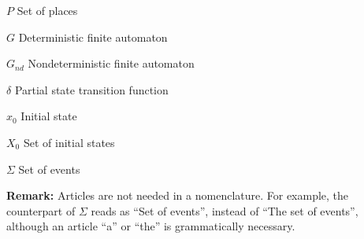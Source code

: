 $P$ \hspace{6em}   Set of places

$G$ \hspace{6em} Deterministic finite automaton

$G_{nd}$ \hspace{5.2em} Nondeterministic finite automaton

$\delta$ \hspace{6.4em} Partial state transition function

$x_0$ \hspace{5.9em} Initial state

$X_0$ \hspace{5.6em} Set of initial states

$\Sigma$ \hspace{6.1em} Set of events


\medskip\medskip
\noindent\textbf{Remark:} Articles are not needed in a nomenclature. For example, the counterpart of $\Sigma$ reads as ``Set of events'', instead of ``The set of events'', although an article ``a'' or ``the'' is grammatically necessary.
